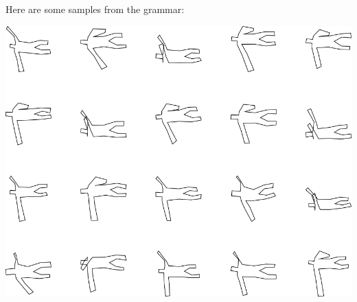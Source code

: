 Here are some samples from the grammar:

\includegraphics[width=6in]{output/3.learning/incremental/gram.7.d/samples.png}


